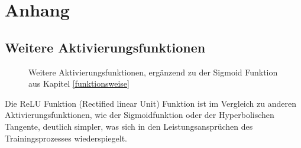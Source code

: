 \appendix
\label{Anhang}
\section{Anhang}

\subsection{Weitere Aktivierungsfunktionen}\label{anhang:weitereaktivierungsfunktionen}

\begin{figure}[h]
    \center
    
    \caption[Aktivierungsfunktionen]{Weitere Aktivierungsfunktionen, ergänzend zu der Sigmoid Funktion aus Kapitel \ref{funktionsweise}}
    \label{Aktivierungsfunktionen}%
\end{figure}

Die ReLU Funktion (Rectified linear Unit) Funktion ist im Vergleich zu anderen Aktivierungsfunktionen, wie der Sigmoidfunktion oder der Hyperbolischen Tangente, deutlich simpler, was sich in den Leistungsansprüchen des Trainingsprozesses wiederspiegelt.



